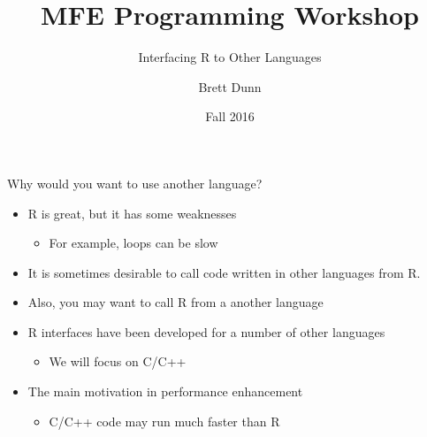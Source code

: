 \documentclass[ignorenonframetext,]{beamer}
\title{MFE Programming Workshop}
\subtitle{Interfacing R to Other Languages}
\author{Brett Dunn}
\date{Fall 2016}
\providecommand{\tightlist}{%
\setlength{\itemsep}{0pt}\setlength{\parskip}{0pt}}
\begin{document}
\frame{\titlepage}

\begin{frame}{Why would you want to use another language?}

\begin{itemize}
\tightlist
\item
  R is great, but it has some weaknesses

  \begin{itemize}
  \tightlist
  \item
    For example, loops can be slow
  \end{itemize}
\item
  It is sometimes desirable to call code written in other languages from
  R.
\item
  Also, you may want to call R from a another language
\item
  R interfaces have been developed for a number of other languages

  \begin{itemize}
  \tightlist
  \item
    We will focus on C/C++
  \end{itemize}
\item
  The main motivation in performance enhancement

  \begin{itemize}
  \tightlist
  \item
    C/C++ code may run much faster than R
  \end{itemize}
\end{itemize}

\end{frame}
\end{document}
